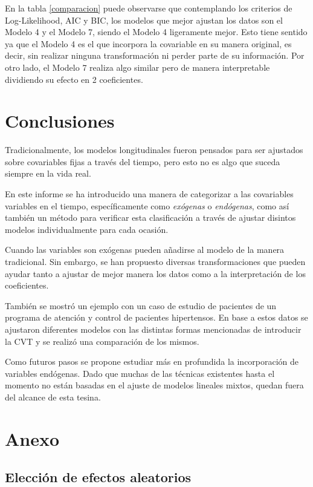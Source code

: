 \documentclass[spanish]{article}
\numberwithin{figure}{subsection}
\numberwithin{equation}{subsection}
\numberwithin{table}{subsection}
\begin{document}
En la tabla \ref{comparacion} puede observarse que contemplando los criterios de
Log-Likelihood, AIC y BIC, los modelos que mejor ajustan los datos son el Modelo
4 y el Modelo 7, siendo el Modelo 4 ligeramente mejor. Esto tiene sentido ya que
el Modelo 4 es el que incorpora la covariable en su manera original, es decir,
sin realizar ninguna transformación ni perder parte de su información. Por otro
lado, el Modelo 7 realiza algo similar pero de manera interpretable dividiendo
su efecto en 2 coeficientes.

\newpage

\section{Conclusiones}

Tradicionalmente, los modelos longitudinales fueron pensados para ser ajustados
sobre covariables fijas a través del tiempo, pero esto no es algo que suceda
siempre en la vida real.

En este informe se ha introducido una manera de categorizar a las covariables
variables en el tiempo, específicamente como \textit{exógenas} o
\textit{endógenas}, como así también un método para verificar esta clasificación
a través de ajustar disintos modelos individualmente para cada ocasión.

Cuando las variables son exógenas pueden añadirse al modelo de la manera
tradicional. Sin embargo, se han propuesto diversas transformaciones que pueden
ayudar tanto a ajustar de mejor manera los datos como a la interpretación de los
coeficientes.

También se mostró un ejemplo con un caso de estudio de pacientes de un programa
de atención y control de pacientes hipertensos. En base a estos datos se
ajustaron diferentes modelos con las distintas formas mencionadas de introducir
la CVT y se realizó una comparación de los mismos.

Como futuros pasos se propone estudiar más en profundida la incorporación
de variables endógenas. Dado que muchas de las técnicas existentes hasta el
momento no están basadas en el ajuste de modelos lineales mixtos, quedan fuera
del alcance de esta tesina.

\newpage

\section{Anexo}

\subsection{Elección de efectos aleatorios}
\label{eleccion_efectos_aleatorios}
\end{document}
